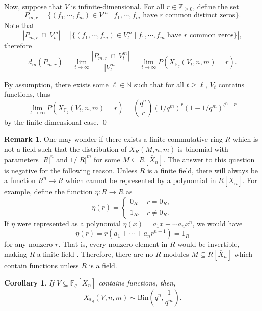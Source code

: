 \documentclass[12pt]{amsart}
\newtheorem{corollary}[theorem]{Corollary}
\theoremstyle{definition}
\newtheorem{remark}[theorem]{Remark}
\newcommand{\FF}{\mathbb{F} }
\newcommand{\NN}{\mathbb{N} }
\newcommand{\ZZ}{\mathbb{Z} }
\begin{document}
Now, suppose that $V$ is infinite-dimensional. For all $r \in \ZZ_{\ge 0}$, define the set
\[
P_{m,r} = \{(f_1, \cdots , f_m) \in V^m \mid f_1, \cdots , f_m \text{ have $r$ common distinct zeros} \}.
\]
Note that
\[
|P_{m,r} \ \cap \ V_t^m| = |\{(f_1, \cdots , f_m) \in V_t^m \mid f_1, \cdots , f_m \text{ have $r$ common zeros} \}|,
\]
therefore
\[
d_m(P_{m,r}) = \lim_{t \to \infty}\frac{|P_{m,r} \ \cap \ V_t^m|}{|V_t^m|} = \lim_{t \to \infty} P(X_{\FF_q}(V_t, n, m) = r).
\]

By assumption, there exists some $\ell \in \NN$ such that for all $t \ge \ell$, $V_t$ contains functions, thus
\[
\lim_{t \to \infty} P(X_{\FF_q}(V_t, n, m) = r) = \binom{q^n}{r} \left( 1/q^m \right)^r \left( 1 - 1/q^m \right)^{q^n - r}
\]
by the finite-dimensional case. \qed



\begin{remark}\label{rmk: ringrmk}
One may wonder if there exists a finite commutative ring $R$ which is not a field such that the distribution of $X_R(M,n,m)$ is binomial with parameters $|R|^n$ and $1/|R|^m$ for some $M \subseteq R[\overline{X}_n]$. The answer to this question is negative for the following reason. Unless $R$ is a finite field, there will always be a function $R^n \to R$ which cannot be represented by a polynomial in $R[\overline{X}_n]$. For example, define the function $\eta: R \to R$ as
\[
    \eta(r)  = \begin{cases}
        0_R & r = 0_R,\\
        1_R, & r \ne 0_R.
    \end{cases}
\]
If $\eta$ were represented as a polynomial $\eta(x) = a_1x + \cdots a_nx^n$, we would have
\[
\eta(r) = r(a_1 + \cdots + a_nr^{n-1}) = 1_R
\]
for any nonzero $r$. That is, every nonzero element in $R$ would be invertible, making $R$ a finite field \cite{Fri99}. Therefore, there are no $R$-modules $M \subseteq R[\overline{X}_n]$ which contain functions unless $R$ is a field.
\end{remark}

\begin{corollary}\label{cor: bincor}
If $V \subseteq \FF_q[\overline{X}_n]$ contains functions, then,
\[
X_{\FF_q}(V, n, m) \sim \mathrm{Bin} \left( q^n, \frac{1}{q^m} \right).
\]
\end{corollary}
\end{document}
